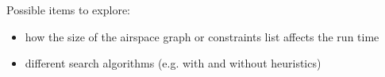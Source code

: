 \documentclass{article}
\begin{document}
Possible items to explore:

\begin{itemize}
\item how the size of the airspace graph or constraints list affects the run time
\item different search algorithms (e.g. with and without heuristics)
\end{itemize}


\begin{thebibliography}{99} %
 
\end{thebibliography}

\end{document}
